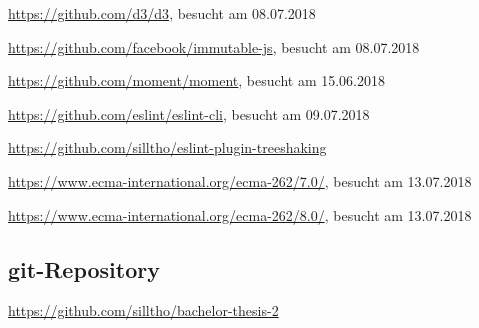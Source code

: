 \url{https://github.com/d3/d3}, besucht am 08.07.2018

\url{https://github.com/facebook/immutable-js}, besucht am 08.07.2018

\url{https://github.com/moment/moment}, besucht am 15.06.2018

\url{https://github.com/eslint/eslint-cli}, besucht am 09.07.2018

\url{https://github.com/silltho/eslint-plugin-treeshaking}

\url{https://www.ecma-international.org/ecma-262/7.0/}, besucht am 13.07.2018

\url{https://www.ecma-international.org/ecma-262/8.0/}, besucht am 13.07.2018


\subsection{git-Repository}
{\color{red}\url{https://github.com/silltho/bachelor-thesis-2}}
